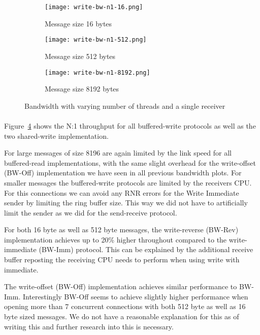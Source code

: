 \begin{figure}[ht]
  \centering
\begin{subfigure}[b]{0.49\textwidth}
  \centering
  \texttt{[image: write-bw-n1-16.png]}
  \caption{Message size 16 bytes}
  \label{fig:plot-write-bw-n1-16}
\end{subfigure}
\begin{subfigure}[b]{0.49\textwidth}
  \centering
  \texttt{[image: write-bw-n1-512.png]}
  \caption{Message size 512 bytes}
  \label{fig:plot-write-bw-n1-512}
\end{subfigure}
\begin{subfigure}[b]{0.49\textwidth}
  \centering
  \texttt{[image: write-bw-n1-8192.png]}
  \caption{Message size 8192 bytes}
  \label{fig:plot-write-bw-n1-8192}
\end{subfigure}
  \caption{Bandwidth with varying number of threads and a single receiver}
  \label{fig:plot-write-bw-n1}
\end{figure}

\paragraph{} Figure~\ref{fig:plot-write-bw-n1} shows the N:1 throughput for all buffered-write protocols as 
well as the two shared-write implementation.

For large messages of size 8196 are again limited by the link speed for all buffered-read implementations, 
with the same slight overhead for the write-offset (BW-Off) implementation we have seen in all previous bandwidth plots.
For smaller messages the buffered-write protocols are limited by the receivers CPU. For this connections we can avoid any 
RNR errors for the Write Immediate sender by limiting the ring buffer size. This way we did not have to artificially limit 
the sender as we did for the send-receive protocol.

For both 16 byte as well as 512 byte messages, the write-reverse (BW-Rev) implementation achieves up to 20\% higher throughout
compared to the write-immediate (BW-Imm) protocol. This can be explained by the additional receive buffer reposting the 
receiving CPU needs to perform when using write with immediate. 

The write-offset (BW-Off) implementation achieves similar performance to BW-Imm. Interestingly BW-Off seems to achieve slightly 
higher performance when opening more than 7 concurrent connections with both 512 byte as well as 16 byte sized messages. We do 
not have a reasonable explanation for this as of writing this and further research into this is necessary.


